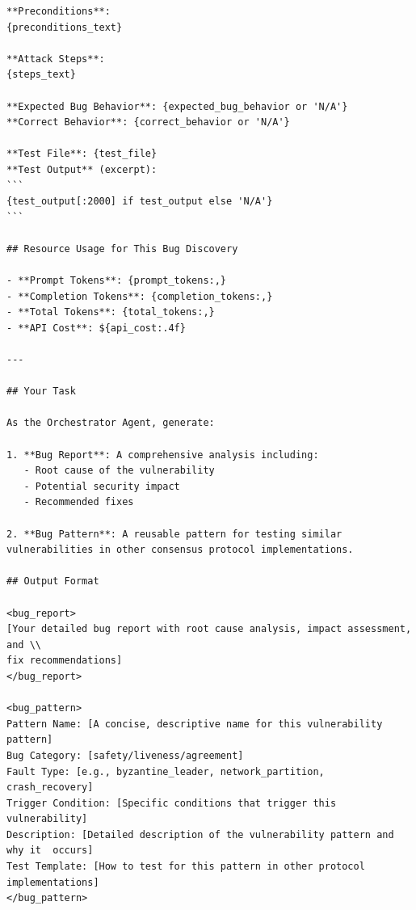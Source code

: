 \documentclass{article}
\theoremstyle{plain}
\theoremstyle{definition}
\theoremstyle{remark}
\begin{document}
\begin{agentbox}
{\begin{Verbatim}[fontsize=\scriptsize]
**Preconditions**:
{preconditions_text}

**Attack Steps**:
{steps_text}

**Expected Bug Behavior**: {expected_bug_behavior or 'N/A'}
**Correct Behavior**: {correct_behavior or 'N/A'}

**Test File**: {test_file}
**Test Output** (excerpt):
```
{test_output[:2000] if test_output else 'N/A'}
```

## Resource Usage for This Bug Discovery

- **Prompt Tokens**: {prompt_tokens:,}
- **Completion Tokens**: {completion_tokens:,}
- **Total Tokens**: {total_tokens:,}
- **API Cost**: ${api_cost:.4f}

---

## Your Task

As the Orchestrator Agent, generate:

1. **Bug Report**: A comprehensive analysis including:
   - Root cause of the vulnerability
   - Potential security impact
   - Recommended fixes

2. **Bug Pattern**: A reusable pattern for testing similar vulnerabilities in other consensus protocol implementations.

## Output Format

<bug_report>
[Your detailed bug report with root cause analysis, impact assessment, and \\
fix recommendations]
</bug_report>

<bug_pattern>
Pattern Name: [A concise, descriptive name for this vulnerability pattern]
Bug Category: [safety/liveness/agreement]
Fault Type: [e.g., byzantine_leader, network_partition, crash_recovery]
Trigger Condition: [Specific conditions that trigger this vulnerability]
Description: [Detailed description of the vulnerability pattern and why it  occurs]
Test Template: [How to test for this pattern in other protocol implementations]
</bug_pattern>
    \end{Verbatim}
    
    \bigskip
    }
    \end{agentbox}
\end{document}
